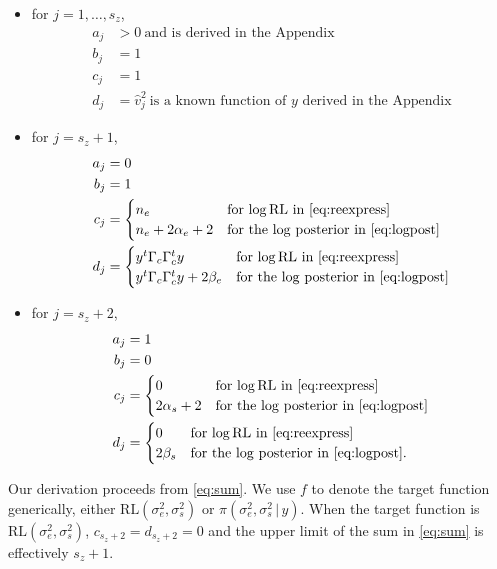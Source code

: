 \documentclass{report}
\newcommand{\RLorig}{\text{RL}}
\newcommand{\logRLorig}{\log\RLorig}
\newcommand{\sigssq}{\sigma_s^2}
\newcommand{\sigesq}{\sigma_e^2}
\newcommand{\g}{\,|\,}
\begin{document}
\begin{itemize}[label=---]
\item for $j = 1, \dots, s_z$,
  \begin{align*}
    a_j &> 0\ \text{and is derived in the Appendix}\\
    b_j &=1\\
    c_j &=1\\
    d_j &= \hat v_j^2\ \text{is a known function of $y$ derived in the Appendix}
  \end{align*}
\item for $j = s_z +1$,
  \begin{align*}
    a_j &= 0\\
    b_j &= 1\\
    c_j &= \begin{cases}
                 n_e & \text{for $\logRLorig$ in \eqref{eq:reexpress}}\\
                 n_e + 2\alpha_e + 2 & \text{for the $\log$ posterior in \eqref{eq:logpost}}
              \end{cases}\\
    d_j &= \begin{cases}
                 y^t \Gamma_c \Gamma^t_c y & \text{for $\logRLorig$ in \eqref{eq:reexpress}}\\
                 y^t \Gamma_c \Gamma^t_c y + 2\beta_e & \text{for the $\log$ posterior in \eqref{eq:logpost}}
              \end{cases}
  \end{align*}
\item for $j = s_z+2$,
  \begin{align*}
    a_j &= 1\\
    b_j &= 0\\
    c_j &= \begin{cases}
      0 & \text{for $\logRLorig$ in \eqref{eq:reexpress}}\\
      2 \alpha_s + 2 & \text{for the $\log$ posterior in \eqref{eq:logpost}}
    \end{cases}\\
    d_j &= \begin{cases}
      0 & \text{for $\logRLorig$ in \eqref{eq:reexpress}}\\
      2 \beta_s & \text{for the $\log$ posterior in \eqref{eq:logpost}}.
    \end{cases}
  \end{align*}
\end{itemize}
Our derivation proceeds from \eqref{eq:sum}.  We use $f$ to denote the target function generically, either $\RLorig(\sigesq,\sigssq)$ or $\pi(\sigesq,\sigssq\g y)$.  When the target function is $\RLorig(\sigesq,\sigssq)$, $c_{s_z+2} = d_{s_z+2} = 0$ and the upper limit of the sum in \eqref{eq:sum} is effectively $s_z+1$.
\end{document}
